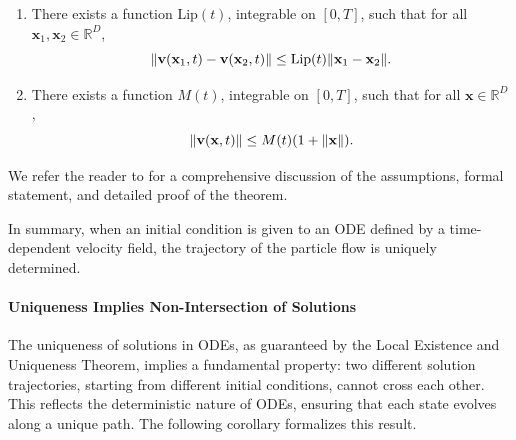 \begin{enumerate}[label=(\roman*)]
    \item {} There exists a function $\mathrm{Lip}(t)$, integrable on $[0, T]$, such that for all $\mathbf{x}_1, \mathbf{x}_2 \in \mathbb{R}^D$,
    \[
    \|{\mathbf{v}}(\mathbf{x}_1, t) - {\mathbf{v}}(\mathbf{x}_2, t)\| \leq \mathrm{Lip}(t) \|\mathbf{x}_1 - \mathbf{x}_2\|.
    \]
    
    \item {} There exists a function $M(t)$, integrable on $[0, T]$, such that for all $\mathbf{x} \in \mathbb{R}^D$,
    \[
    \|{\mathbf{v}}(\mathbf{x}, t)\| \leq M(t)(1 + \|\mathbf{x}\|).
    \]
\end{enumerate}
We refer the reader to \citep{reid1971ordinary} for a comprehensive discussion of the assumptions, formal statement, and detailed proof of the theorem.


In summary, when an initial condition is given to an ODE defined by a time-dependent velocity field, the trajectory of the particle flow is uniquely determined.

\paragraph{Uniqueness Implies Non-Intersection of Solutions} The uniqueness of solutions in ODEs, as guaranteed by the Local Existence and Uniqueness Theorem, implies a fundamental property: two different solution trajectories, starting from different initial conditions, cannot cross each other. This reflects the deterministic nature of ODEs, ensuring that each state evolves along a unique path. The following corollary formalizes this result.


